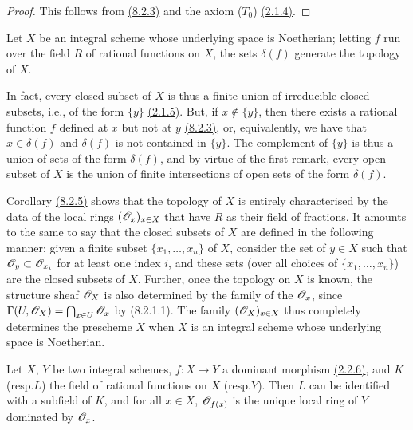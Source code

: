 \begin{proof}
\label{proof-cor-1.8.2.4}
This follows from \hyperref[cor-1.8.2.3]{(8.2.3)} and the axiom ($T_0$) \hyperref[prop-1.2.1.4]{(2.1.4)}.
\end{proof}

\begin{cor}[8.2.5]
\label{cor-1.8.2.5}
Let $X$ be an integral scheme whose underlying
space is Noetherian; letting $f$ run over the field $R$ of rational functions on
$X$, the sets $\delta(f)$ generate the topology of $X$.
\end{cor}

In fact, every closed subset of $X$ is thus a finite union of irreducible closed
subsets, i.e., of the form $\overline{\{y\}}$ \hyperref[prop-1.2.1.5]{(2.1.5)}. But, if
$x\not\in\overline{\{y\}}$, then there exists a rational function $f$ defined at
$x$ but not at $y$ \hyperref[cor-1.8.2.3]{(8.2.3)}, or, equivalently, we have that $x\in\delta(f)$
and $\delta(f)$ is not contained in $\overline{\{y\}}$. The complement of
$\overline{\{y\}}$ is thus a union of sets of the form $\delta(f)$, and by
virtue of the first remark, every open subset of $X$ is the union of finite
intersections of open sets of the form $\delta(f)$.

\begin{env}[8.2.6]
\label{env-1.8.2.6}
Corollary \hyperref[cor-1.8.2.5]{(8.2.5)} shows that the topology of $X$ is
entirely characterised by the data of the local rings $(\mathscr{O}_x)_{x\in X}$ that
have $R$ as their field of fractions. It amounts to the same to say that the
closed subsets of $X$ are defined in the following manner: given a finite subset
$\{x_1,\ldots,x_n\}$ of $X$, consider the set of $y\in X$ such that
$\mathscr{O}_y\subset\mathscr{O}_{x_i}$ for at least one index $i$, and these sets (over all
choices of $\{x_1,\ldots,x_n\}$) are the closed subsets of $X$. Further, once
the topology on $X$ is known, the structure sheaf $\mathscr{O}_X$ is also determined by
the family of the $\mathscr{O}_x$, since $\Gamma(U,\mathscr{O}_X)=\bigcap_{x\in U}\mathscr{O}_x$ by
(8.2.1.1). The family $(\mathscr{O}_X)_{x\in X}$ thus completely determines the
prescheme $X$ when $X$ is an integral scheme whose underlying space is
Noetherian.
\end{env}

\begin{prop}[8.2.7]
\label{prop-1.8.2.7}
Let $X$, $Y$ be two integral schemes, $f:X\to Y$ a dominant morphism
\hyperref[env-1.2.2.6]{(2.2.6)}, and $K$ (resp.$L$) the field of rational
functions on $X$ (resp.$Y$). Then $L$ can be identified with a subfield of
$K$, and for all $x\in X$, $\mathscr{O}_{f(x)}$ is the unique local ring of $Y$ dominated
by $\mathscr{O}_x$.
\end{prop}

